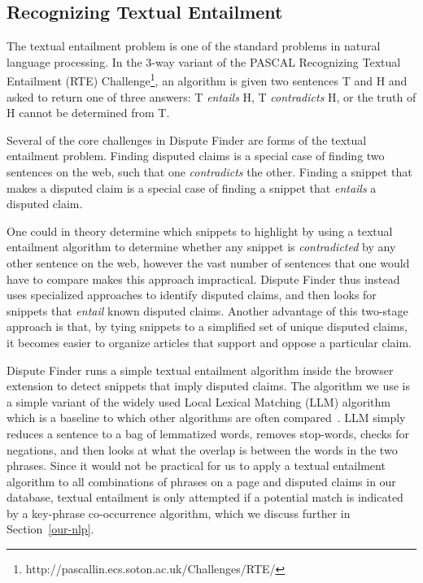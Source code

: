 \documentclass{www2010-submission}
\newcommand{\todo}[1]{}
\begin{document}
\subsection{Recognizing Textual Entailment}
\label{related:entailment}

\todo{Trim this down??}

The textual entailment problem is one of the standard problems in natural language processing. In the 3-way variant of the PASCAL Recognizing Textual Entailment (RTE) Challenge\footnote{http://pascallin.ecs.soton.ac.uk/Challenges/RTE/}, an algorithm is given two sentences T and H and asked to return one of three answers: T {\it entails} H, T {\it contradicts} H, or the truth of H cannot be determined from T. 

Several of the core challenges in Dispute Finder are forms of the textual entailment problem. Finding disputed claims is a special case of finding two sentences on the web, such that one {\it contradicts} the other. Finding a snippet that makes a disputed claim is a special case of finding a snippet that {\it entails} a disputed claim. 

One could in theory determine which snippets to highlight by using a textual entailment algorithm to determine whether any snippet is {\it contradicted} by any other sentence on the web, however the vast number of sentences that one would have to compare makes this approach impractical. Dispute Finder thus instead uses specialized approaches to identify disputed claims, and then looks for snippets that {\it entail} known disputed claims. Another advantage of this two-stage approach is that, by tying snippets to a simplified set of unique disputed claims, it becomes easier to organize articles that support and oppose a particular claim.

Dispute Finder runs a simple textual entailment algorithm inside the browser extension to detect snippets that imply disputed claims. The algorithm we use is a simple variant of the widely used Local Lexical Matching (LLM) algorithm~\cite{Jijkoun2006} which is a baseline to which other algorithms are often compared~\cite{Braz}. LLM simply reduces a sentence to a bag of lemmatized words, removes stop-words, checks for negations, and then looks at what the overlap is between the words in the two phrases. Since it would not be practical for us to apply a textual entailment algorithm to all combinations of phrases on a page and disputed claims in our database, textual entailment is only attempted if a potential match is indicated by a key-phrase co-occurrence algorithm, which we discuss further in Section~\ref{our-nlp}.
\end{document}
